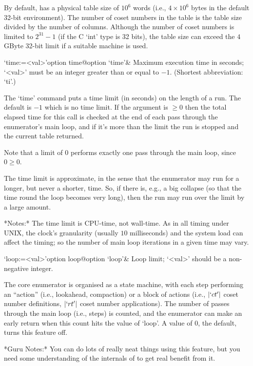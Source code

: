 By default, {\ACE} has a physical table size of $10^6$ words (i.e., $4
\times 10^6$ bytes in the  default 32-bit environment).  The number of
coset numbers in the table is  the table size divided by the number of
columns.   Although  the  number   of  coset  numbers  is  limited  to
$2^{31}-1$ (if the C `int' type is 32 bits), the table size can exceed
the $4$GByte 32-bit limit if a suitable machine is used.

\>`time:=<val>'{option time}@{option `time'}&
Maximum execution time in seconds; `<val>' must be an integer  greater
than or equal to $-1$. (Shortest abbreviation: `ti'.)

The `time' command  puts a time limit (in seconds) on  the length of a
run. The default is $-1$  which is no  time limit. If the  argument is
$\ge0$ then the total elapsed time for this call is checked at the end
of each pass through the enumerator's main loop, and if it's more than
the limit the run is stopped and the current table returned.

Note that a limit of $0$ performs exactly one pass  through  the  main
loop, since $0 \ge 0$.

The time  limit is approximate, in  the sense that  the enumerator may
run for a longer, but never a shorter, time.  So, if there is, e.g., a
big collapse (so that the time round the loop becomes very long), then
the run may run over the limit by a large amount.

*Notes:*
The time limit is CPU-time, not wall-time.  As  in  all  timing  under
UNIX, the clock's granularity  (usually  $10$  milliseconds)  and  the
system load can  affect  the  timing;  so  the  number  of  main  loop
iterations in a given time may vary.

\>`loop:=<val>'{option loop}@{option `loop'}&
Loop limit; `<val>' should be a non-negative integer.

The core enumerator is organised as a state machine,  with  each  step
performing an ``action'' (i.e., lookahead, compaction) or a  block  of
actions (i.e.,  $|`ct'|$  coset  number  definitions,  $|`rt'|$  coset
number applications). The number  of  passes  through  the  main  loop
(i.e., steps) is counted, and the enumerator can make an early  return
when this count hits the value of `loop'. A value of $0$, the default,
turns this feature off.

*Guru Notes:*
You can do lots of really neat things using this feature, but you need
some understanding of the internals of {\ACE} to get real benefit from
it.

